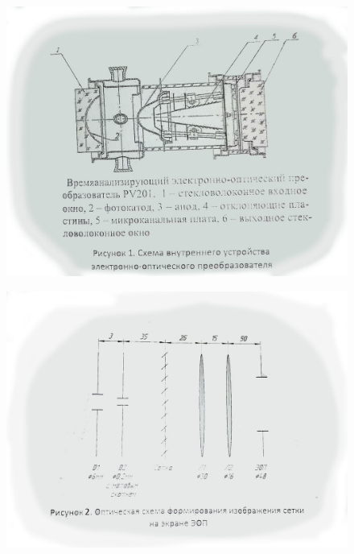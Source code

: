 \documentclass[a4paper,12pt]{article}
\theoremstyle{plain} %
\theoremstyle{definition} %
\theoremstyle{remark} %
\begin{document}
\begin{figure}[h]
\begin{center}
\includegraphics[width=0.7\linewidth]{схема устройства эоп.jpg}
\end{center}
\end{figure}

\begin{figure}[h]
\begin{center}
\includegraphics[width=0.7\linewidth]{опт схема эоп.jpg}
\end{center}
\end{figure}

\newpage
\end{document}
